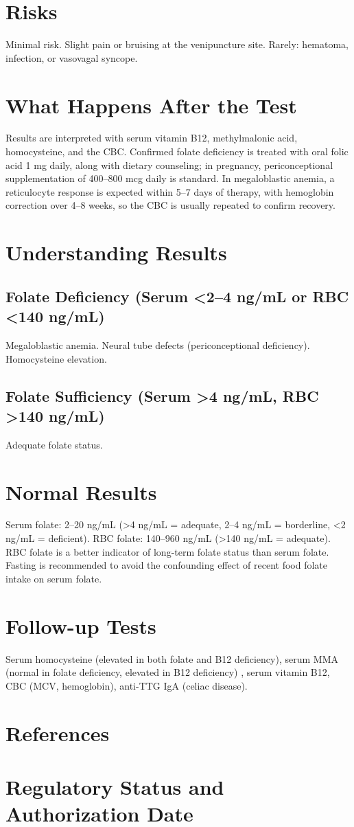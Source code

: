 \section*{Risks}
Minimal risk. Slight pain or bruising at the venipuncture site. Rarely: hematoma, infection, or vasovagal syncope.
\section*{What Happens After the Test}
Results are interpreted with serum vitamin B12, methylmalonic acid, homocysteine, and the CBC. Confirmed folate deficiency is treated with oral folic acid 1 mg daily, along with dietary counseling; in pregnancy, periconceptional supplementation of 400--800 mcg daily is standard. In megaloblastic anemia, a reticulocyte response is expected within 5--7 days of therapy, with hemoglobin correction over 4--8 weeks, so the CBC is usually repeated to confirm recovery.
\section*{Understanding Results}
\subsection*{Folate Deficiency (Serum <2--4 ng/mL or RBC <140 ng/mL)}
Megaloblastic anemia. Neural tube defects (periconceptional deficiency). Homocysteine elevation.
\subsection*{Folate Sufficiency (Serum >4 ng/mL, RBC >140 ng/mL)}
Adequate folate status.
\section*{Normal Results}
Serum folate: 2--20 ng/mL (>4 ng/mL = adequate, 2--4 ng/mL = borderline, <2 ng/mL = deficient). RBC folate: 140--960 ng/mL (>140 ng/mL = adequate). RBC folate is a better indicator of long-term folate status than serum folate. Fasting is recommended to avoid the confounding effect of recent food folate intake on serum folate.
\section*{Follow-up Tests}
Serum homocysteine (elevated in both folate and B12 deficiency), serum MMA (normal in folate deficiency, elevated in B12 deficiency) \cite{green2017vitamin}, serum vitamin B12, CBC (MCV, hemoglobin), anti-TTG IgA (celiac disease).
\section*{References}


\clearpage
\section*{Regulatory Status and Authorization Date}

\clearpage
